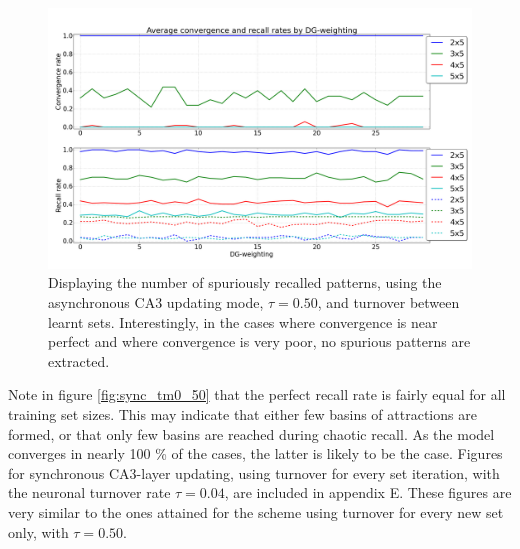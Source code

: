 \begin{figure}
    \centering
    \includegraphics[width=13cm]{fig/DGWs/async_tm0_50}
    \caption{Displaying the number of spuriously recalled patterns, using the asynchronous CA3 updating mode, $\tau=0.50$, and turnover between learnt sets. Interestingly, in the cases where convergence is near perfect and where convergence is very poor, no spurious patterns are extracted.}
    \label{fig:async_tm0_50}
\end{figure}

Note in figure \ref{fig:sync_tm0_50} that the perfect recall rate is fairly equal for all training set sizes. This may indicate that either few basins of attractions are formed, or that only few basins are reached during chaotic recall. As the model converges in nearly 100 \% of the cases, the latter is likely to be the case. Figures for synchronous CA3-layer updating, using turnover for every set iteration, with the neuronal turnover rate $\tau=0.04$, are included in appendix E. These figures are very similar to the ones attained for the scheme using turnover for every new set only, with $\tau=0.50$.

